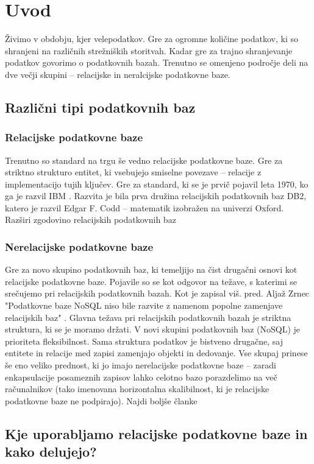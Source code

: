 \documentclass[a4paper,12pt,openright]{book}
\begin{document}
\chapter{Uvod}
    Živimo v obdobju, kjer velepodatkov. Gre za ogromne količine podatkov, ki so shranjeni na različnih strežniških storitvah. Kadar gre za trajno shranjevanje podatkov govorimo o podatkovnih bazah. Trenutno se omenjeno področje deli na dve večji skupini – relacijske in neralcijske podatkovne baze.
    \section{Različni tipi podatkovnih baz}
        \subsection{Relacijske podatkovne baze}
        Trenutno so standard na trgu še vedno relacijske podatkovne baze. Gre za striktno strukturo entitet, ki vsebujejo smiselne povezave – relacije z implementacijo tujih ključev. Gre za standard, ki se je prvič pojavil leta 1970, ko ga je razvil IBM \cite{IBM_DMBS_1970}. Razvita je bila prva družina relacijskih podatkovnih baz DB2, katero je razvil Edgar F. Codd – matematik izobražen na univerzi Oxford.
        \colorbox{BurntOrange}{Razširi zgodovino relacijskih podatkovnih baz}
        \subsection{Nerelacijske podatkovne baze}
        Gre za novo skupino podatkovnih baz, ki temeljijo na čist drugačni osnovi kot relacijske podatkovne baze. Pojavile so se kot odgovor na težave, s katerimi se srečujemo pri relacijskih podatkovnih bazah. Kot je zapisal viš. pred. Aljaž Zrnec "Podatkovne baze NoSQL niso bile razvite z namenom popolne zamenjave relacijskih baz" \cite{zrnec2011podatkovne}. Glavna težava pri relacijskih podatkovnih bazah je striktna struktura, ki se je moramo držati. V novi skupini podatkovnih baz (NoSQL) je prioriteta fleksibilnost. Sama struktura podatkov je bistveno drugačne, saj entitete in relacije med zapisi zamenjajo objekti in dedovanje. Vse skupaj prinese še eno veliko prednost, ki jo imajo nerelacijske podatkovne baze – zaradi enkapsulacije posameznih zapisov lahko celotno bazo porazdelimo na več računalnikov (tako imenovana horizontalna skalibilnost, ki je relacijske podatkovne baze ne podpirajo).
        \colorbox{BurntOrange}{Najdi boljše članke}
    
    \section{Kje uporabljamo relacijske podatkovne baze in kako delujejo?}
\end{document}

